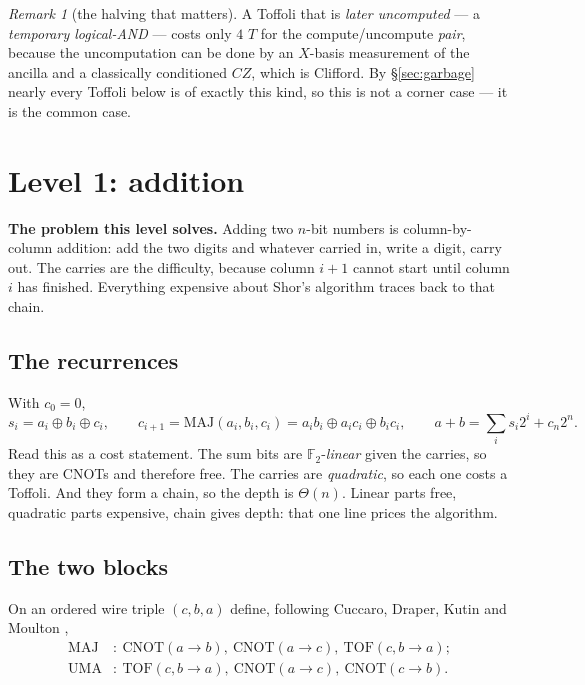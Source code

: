 \documentclass[11pt]{article}
\newcommand{\MAJ}{\mathrm{MAJ}}
\newcommand{\UMA}{\mathrm{UMA}}
\newcommand{\TOF}{\mathrm{TOF}}
\newcommand{\CNOT}{\mathrm{CNOT}}
\theoremstyle{plain}
\theoremstyle{remark}
\newtheorem*{remark}{Remark}
\begin{document}
\begin{remark}[the halving that matters]
A Toffoli that is \emph{later uncomputed} --- a \emph{temporary logical-AND} \cite{gidney-and} ---
costs only $4$ $T$ for the compute/uncompute \emph{pair}, because the uncomputation can be done by
an $X$-basis measurement of the ancilla and a classically conditioned $CZ$, which is Clifford. By
\S\ref{sec:garbage} nearly every Toffoli below is of exactly this kind, so this is not a corner
case --- it is the common case.
\end{remark}

\section{Level 1: addition}\label{sec:l1}

\textbf{The problem this level solves.} Adding two $n$-bit numbers is column-by-column addition:
add the two digits and whatever carried in, write a digit, carry out. The carries are the
difficulty, because column $i{+}1$ cannot start until column $i$ has finished. Everything expensive
about Shor's algorithm traces back to that chain.

\subsection{The recurrences}
With $c_0=0$,
\begin{equation}\label{eq:schoolbook}
s_i=a_i\oplus b_i\oplus c_i,
\qquad
c_{i+1}=\MAJ(a_i,b_i,c_i)=a_ib_i\oplus a_ic_i\oplus b_ic_i,
\qquad
a+b=\sum_i s_i2^i+c_n2^n .
\end{equation}
Read this as a cost statement. The sum bits are $\mathbb F_2$-\emph{linear} given the carries, so
they are CNOTs and therefore free. The carries are \emph{quadratic}, so each one costs a Toffoli.
And they form a chain, so the depth is $\Theta(n)$. Linear parts free, quadratic parts expensive,
chain gives depth: that one line prices the algorithm.

\subsection{The two blocks}
On an ordered wire triple $(c,b,a)$ define, following Cuccaro, Draper, Kutin and Moulton
\cite{cuccaro},
\begin{align*}
\MAJ&:\ \CNOT(a\!\to\!b),\ \CNOT(a\!\to\!c),\ \TOF(c,b\!\to\!a);\\
\UMA&:\ \TOF(c,b\!\to\!a),\ \CNOT(a\!\to\!c),\ \CNOT(c\!\to\!b).
\end{align*}
\end{document}
